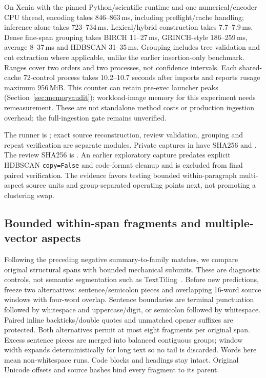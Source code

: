 \documentclass[11pt]{article}
\begin{document}
On Xenia with the pinned Python/scientific runtime and one numerical/encoder
CPU thread, encoding takes 846--863\,ms, including preflight/cache handling;
inference alone takes 723--734\,ms. Lexical/hybrid construction takes
7.7--7.9\,ms. Dense fine-span grouping takes BIRCH 11--27\,ms,
GRINCH-style 186--259\,ms, average 8--37\,ms and HDBSCAN 31--35\,ms.
Grouping includes tree validation and cut extraction where applicable, unlike
the earlier insertion-only benchmark. Ranges cover two orders and two processes,
not confidence intervals. Each shared-cache 72-control process takes
10.2--10.7 seconds after imports and reports rusage maximum 956\,MiB.
This counter can retain pre-exec launcher peaks (Section~\ref{sec:memoryaudit});
workload-image memory for this experiment needs remeasurement.
These are not standalone method costs or production
ingestion overhead; the full-ingestion gate remains unverified.

The runner is ; exact source reconstruction,
review validation, grouping and repeat verification are separate modules.
Private captures in  have SHA256
and .
The review SHA256 is
.
An earlier exploratory capture predates explicit HDBSCAN \texttt{copy=False}
and code-format cleanup and is excluded from final paired verification.
The evidence favors testing bounded within-paragraph multi-aspect source units
and group-separated operating points next, not promoting a clustering swap.

\subsection{Bounded within-span fragments and multiple-vector aspects}
Following the preceding negative summary-to-family matches, we compare original
structural spans with bounded mechanical subunits. These are diagnostic controls,
not semantic segmentation such as TextTiling~\cite{texttiling}. Before new
predictions, freeze two alternatives: sentence/semicolon pieces and overlapping
16-word source windows with four-word overlap. Sentence boundaries are terminal
punctuation followed by whitespace and uppercase/digit, or semicolon followed
by whitespace. Paired inline backticks/double quotes and unmatched opener suffixes
are protected. Both alternatives permit at most eight fragments per original
span. Excess sentence pieces are merged into balanced contiguous groups; window
width expands deterministically for long text so no tail is discarded.
Words here mean non-whitespace runs. Code blocks and headings stay intact.
Original Unicode offsets and source hashes bind every fragment to its parent.
\end{document}
